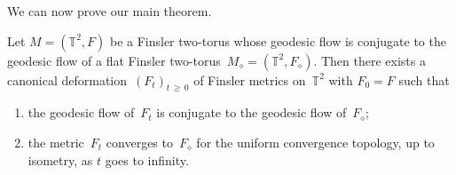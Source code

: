 \documentclass[AHL,Unicode,longabstracts,published]{cedram}
\newcommand{\Z}{\mathbb{Z}}
\newcommand{\T}{\mathbb{T}}
\begin{document}
We can now prove our main theorem.

\begin{theo}\label{theo:fin}
Let $M=(\T^2,F)$ be a Finsler two-torus whose geodesic flow is conjugate to the geodesic flow of a flat Finsler two-torus~$M_\diamond = (\T^2,F_\diamond)$. Then there exists a canonical deformation~$(F_t)_{t\,\geq\,0}$ of Finsler metrics on~$\T^2$ with $F_0=F$ such that
\begin{enumerate}
\item\label{theo13.2.1} the geodesic flow of~$F_t$ is conjugate to the geodesic flow of~$F_\diamond$;
\item the metric~$F_t$ converges to~$F_\diamond$ for the uniform convergence topology, up to isometry, as $t$ goes to infinity. \label{fin2}
\end{enumerate}
\end{theo}

\end{document}
